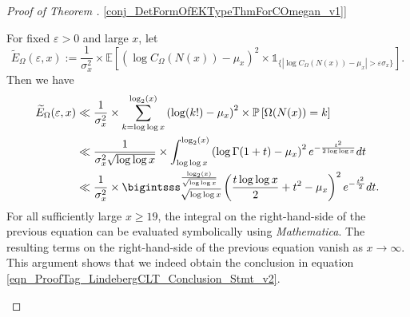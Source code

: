 \documentclass[11pt,reqno,a4letter]{article}
\newcommand{\hlocalref}[1]{\hyperref[#1]{\ref{#1}}}
\numberwithin{equation}{section}
\numberwithin{figure}{section}
\numberwithin{table}{section}
\theoremstyle{plain}
\numberwithin{theorem}{section}
\theoremstyle{definition}
\theoremstyle{remark}
\begin{document}
\begin{proof}[Proof of Theorem \hlocalref{conj_DetFormOfEKTypeThmForCOmegan_v1}]
\begin{itemize}
For fixed $\varepsilon > 0$ and large $x$, let 
\[
\widetilde{E}_{\Omega}(\varepsilon, x) := \frac{1}{\sigma_x^2} \times 
     \mathbb{E}\left[\left(\log C_{\Omega}(N(x)) - \mu_x\right)^2 
     \times 
     \mathds{1}_{\{\left\lvert \log C_{\Omega}(N(x)) - \mu_x \right\rvert > 
     \varepsilon \sigma_x\}}\right]. 
\]
Then we have 
\begin{align*}
\widetilde{E}_{\Omega}(\varepsilon, x) & \ll 
     \frac{1}{\sigma_x^2} \times 
     \sum_{k=\log\log x}^{\log_2(x)} \left(\log(k!) - \mu_x\right)^2 \times 
     \mathbb{P}\left[\Omega(N(x)) = k\right] \\ 
     & \ll 
     \frac{1}{\sigma_x^2 \sqrt{\log\log x}} \times \int_{\log\log x}^{\log_2(x)} 
     \left(\log \Gamma(1+t) - \mu_x\right)^2 e^{-\frac{t^2}{2\log\log x}} dt \\ 
     & \ll 
     \frac{1}{\sigma_x^2} \times 
     \bigintsss_{\sqrt{\log\log x}}^{\frac{\log_2(x)}{\sqrt{\log\log x}}}
     \left(\frac{t \log\log x}{2} + t^2 - \mu_x\right)^2 
     e^{-\frac{t^2}{2}} dt. 
\end{align*} 
For all sufficiently large $x \geq 19$, the integral on the 
right-hand-side of the previous equation can be evaluated 
symbolically using \emph{Mathematica}. 
The resulting terms on the right-hand-side of the previous equation 
vanish as $x \rightarrow \infty$. 
This argument shows that we indeed obtain the conclusion in 
equation \eqref{eqn_ProofTag_LindebergCLT_Conclusion_Stmt_v2}. 
\qedhere
\end{itemize}
\end{proof}
\end{document}
